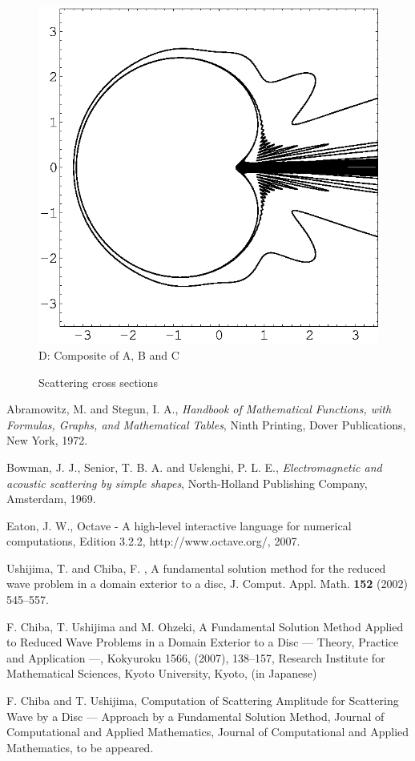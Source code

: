 \documentclass[12pt]{article}
\begin{document}
\begin{figure}[p]
\begin{center}
\includegraphics[scale=0.7]{./ABC.eps}\\ 
{\footnotesize D: Composite of A, B and C}\\
\caption{Scattering cross sections}
\label{fig2}
\end{center}
\end{figure}

\clearpage

\begin{thebibliography}{99}
Abramowitz, M. and Stegun, I. A.,
\emph{Handbook of Mathematical Functions, with Formulas, Graphs, and Mathematical Tables}, Ninth Printing, Dover Publications, New York, 1972.

Bowman, J. J., Senior, T. B. A. and Uslenghi, P. L. E.,
\emph{Electromagnetic and acoustic scattering by simple shapes}, North-Holland Publishing Company, Amsterdam, 1969.

Eaton, J. W., 
{Octave - A high-level interactive language for numerical computations}, Edition 3.2.2, http://www.octave.org/, 2007.

Ushijima, T. and Chiba, F. ,
{A fundamental solution method for the reduced wave problem in a domain exterior to a  disc}, 
  J. Comput. Appl. Math. {\bf 152} (2002) 545--557.

F. Chiba, T. Ushijima and M. Ohzeki,
{A Fundamental Solution Method Applied to Reduced Wave Problems in a Domain Exterior to a Disc --- Theory, Practice and Application ---}, Kokyuroku 1566, (2007), 138--157, Research Institute for Mathematical Sciences, Kyoto University, Kyoto, (in Japanese)

F. Chiba and T. Ushijima, {
Computation of Scattering Amplitude for Scattering Wave by a Disc --- Approach by a Fundamental Solution Method}, Journal of Computational and Applied Mathematics, Journal of Computational and Applied Mathematics, to be appeared.
\end{thebibliography}
\end{document}

